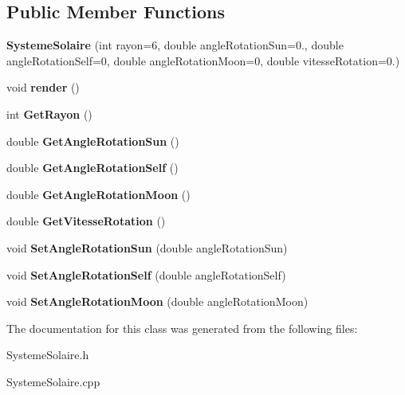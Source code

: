 \subsection*{Public Member Functions}
\begin{DoxyCompactItemize}
\item 
\mbox{\label{classSystemeSolaire_a59fdf9adf37bb0f5b7f7b157757215a5}} 
{\bfseries Systeme\+Solaire} (int rayon=6, double angle\+Rotation\+Sun=0., double angle\+Rotation\+Self=0, double angle\+Rotation\+Moon=0, double vitesse\+Rotation=0.)
\item 
\mbox{\label{classSystemeSolaire_a500de47c923d4284867416bc007b9c11}} 
void {\bfseries render} ()
\item 
\mbox{\label{classSystemeSolaire_a544eb8f28803e4bc23b83023e6300ab1}} 
int {\bfseries Get\+Rayon} ()
\item 
\mbox{\label{classSystemeSolaire_a0e4c265e480b8760f5091b5b6f135449}} 
double {\bfseries Get\+Angle\+Rotation\+Sun} ()
\item 
\mbox{\label{classSystemeSolaire_a17bfa2ce97f413e29d6f9950b75507ef}} 
double {\bfseries Get\+Angle\+Rotation\+Self} ()
\item 
\mbox{\label{classSystemeSolaire_ad7b068c24821285a91aa062b7376297b}} 
double {\bfseries Get\+Angle\+Rotation\+Moon} ()
\item 
\mbox{\label{classSystemeSolaire_a0c59b35f40533dc0884ac1aa72e5f611}} 
double {\bfseries Get\+Vitesse\+Rotation} ()
\item 
\mbox{\label{classSystemeSolaire_a220fddfb1e3806ceea483ac1f4747b93}} 
void {\bfseries Set\+Angle\+Rotation\+Sun} (double angle\+Rotation\+Sun)
\item 
\mbox{\label{classSystemeSolaire_a8fda113ac9fad4b3d89874a84c2ca0ab}} 
void {\bfseries Set\+Angle\+Rotation\+Self} (double angle\+Rotation\+Self)
\item 
\mbox{\label{classSystemeSolaire_a91b98499b32b54e9dc9e67d817ca9730}} 
void {\bfseries Set\+Angle\+Rotation\+Moon} (double angle\+Rotation\+Moon)
\end{DoxyCompactItemize}


The documentation for this class was generated from the following files\+:\begin{DoxyCompactItemize}
\item 
Systeme\+Solaire.\+h\item 
Systeme\+Solaire.\+cpp\end{DoxyCompactItemize}
